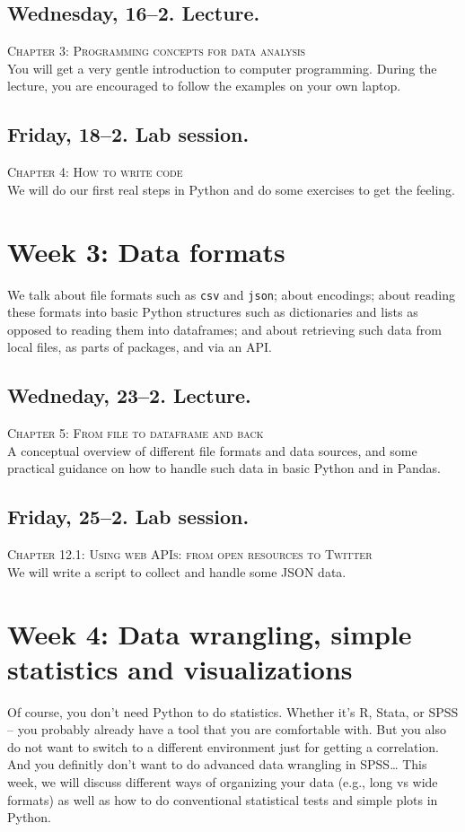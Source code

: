 \subsection*{Wednesday, 16--2. Lecture.}
\textsc{ Chapter 3: Programming concepts for data analysis}\\
You will get a very gentle introduction to computer programming. During the lecture, you are encouraged to follow the examples on your own laptop.


\subsection*{Friday, 18--2. Lab session.}
\textsc{ Chapter 4: How to write code}\\
We will do our first real steps in Python and do some exercises to get the feeling.


\section*{Week 3: Data formats}
We talk about file formats such as \texttt{csv} and \texttt{json}; about encodings; about reading these formats into basic Python structures such as dictionaries and lists as opposed to reading them into dataframes; and about retrieving such data from local files, as parts of packages, and via an API.

\subsection*{Wedneday, 23--2. Lecture.}
\textsc{ Chapter 5: From file to dataframe and back}\\
A conceptual overview of different file formats and data sources, and some practical guidance on how to handle such data in basic Python and in Pandas.


\subsection*{Friday, 25--2. Lab session.}
\textsc{ Chapter 12.1: Using web APIs: from open resources to Twitter}\\
We will write a script to collect and handle some JSON data.



\section*{Week 4: Data wrangling, simple statistics and visualizations}
Of course, you don't need Python to do statistics. Whether it's R, Stata, or SPSS -- you probably already have a tool that you are comfortable with. But you also do not want to switch to a different environment just for getting a correlation. And you definitly don't want to do advanced data wrangling in SPSS\ldots
This week, we will discuss different ways of organizing your data (e.g., long vs wide formats) as well as how to do conventional statistical tests and simple plots in Python.

